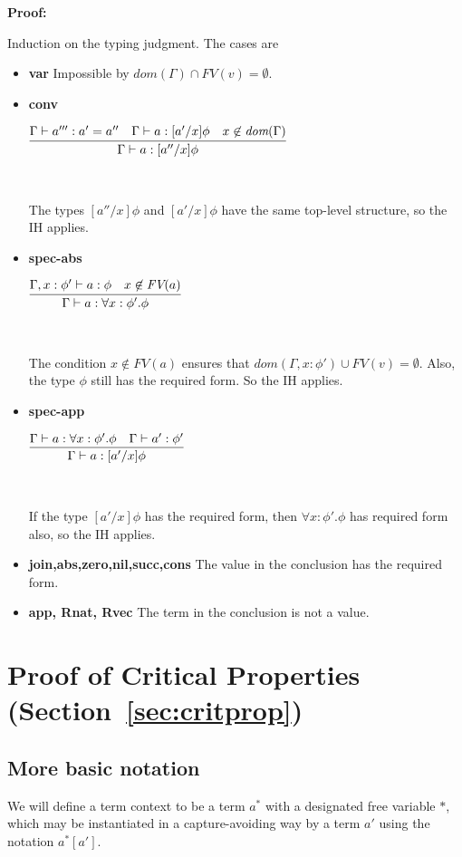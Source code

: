 \documentclass[copyright]{eptcs}
\begin{document}
\noindent \textbf{Proof:}

Induction on the typing judgment. The cases are 
\begin{itemize}
\item \textbf{var} Impossible by $dom(\Gamma) \cap FV(v) = \emptyset$.
\item \textbf{conv}
\

$\infer{\Gamma\vdash a:[a''/x]\phi}{\Gamma \vdash a''': a' = a'' & \Gamma \vdash a:[a'/x]\phi & x\not\in\textit{dom}(\Gamma)}$

\ 

The types $[a''/x]\phi$ and $[a'/x]\phi$ have the same top-level structure, so the IH applies.

\item \textbf{spec-abs}
\

$\infer{\Gamma \vdash a : \forall x:\phi'.\phi}{\Gamma, x:\phi' \vdash a:\phi & x\not\in\textit{FV}(a)}$

\ 

The condition $x\not\in \textit{FV}(a)$ ensures that $dom(\Gamma, x:\phi') \cup FV(v) = \emptyset$. Also, the type $\phi$ still has the required form. So the IH applies.

\item \textbf{spec-app}
\

$\infer{\Gamma \vdash a : [a'/x]\phi}{\Gamma \vdash a:\forall x:\phi'.\phi & \Gamma \vdash a':\phi'}$

\ 

If the type $[a'/x]\phi$ has the required form, then $\forall x:\phi'.\phi$ has required form also, so the IH applies.

\item \textbf{join,abs,zero,nil,succ,cons} The value in the conclusion has the required form.
\item \textbf{app, Rnat, Rvec} The term in the conclusion is not a value.

\end{itemize}

\section{Proof of Critical Properties (Section~\ref{sec:critprop})}

\subsection{More basic notation}

We will define a term context to be a term $a^*$ with a designated free
variable $*$, which may be instantiated in a capture-avoiding way by a
term $a'$ using the notation $a^*[a']$.  
\end{document}
